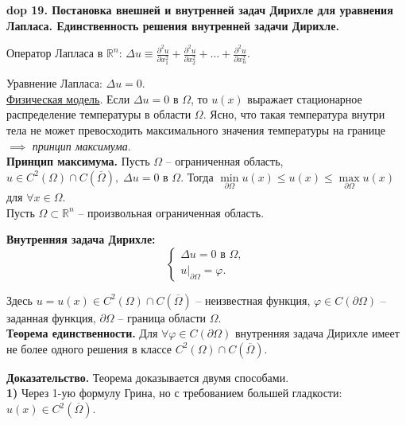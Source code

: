 \setcounter{section}{4}
\setcounter{subsection}{19}
\setcounter{equation}{0}
\textbf{\LARGE dop 19. Постановка внешней и внутренней задач Дирихле для уравнения Лапласа. Единственность решения внутренней задачи Дирихле.}

Оператор Лапласа в $\mathbb{R}^n$: $\Delta u \equiv \frac{\partial^2 u}{\partial x_1^2} + \frac{\partial^2 u}{\partial x_2^2} + \ldots + \frac{\partial^2 u}{\partial x_n^2}$.

Уравнение Лапласа: $\Delta u = 0$.\\

\underline{Физическая модель}. Если $\Delta u = 0$ в $\Omega$, то $u(x)$ выражает стационарное распределение
температуры в области $\Omega$. Ясно, что такая температура внутри тела не может превосходить максимального значения температуры на границе $\implies$ \textit{принцип максимума}.\\

\textbf{Принцип максимума.} Пусть $\Omega$ -- ограниченная область, $u \in C^2(\Omega) \cap C(\overline{\Omega}), \; \Delta u = 0$ в $\Omega$. Тогда $\min\limits_{\partial \Omega} u(x) \leq u(x) \leq \max\limits_{\partial \Omega} u(x)$ для $\forall x \in \Omega$. \\

Пусть $\Omega \subset \mathbb{R}^n$ -- произвольная ограниченная область.

\textbf{Внутренняя задача Дирихле:}
\begin{equation*}
    \begin{cases}
    \Delta u = 0 \text{ в } \Omega, \\
    u |_{\partial \Omega} = \varphi.
    \end{cases}
\end{equation*}

Здесь $u = u(x) \in C^2(\Omega) \cap C(\overline{\Omega})$ -- неизвестная функция, $\varphi \in C(\partial \Omega)$ -- заданная функция, $\partial \Omega$ -- граница области $\Omega$.
\\

\textbf{Теорема единственности.} Для 
$\forall \varphi \in C(\partial \Omega)$ внутренняя задача Дирихле имеет не более одного решения в классе $C^2(\Omega) \cap C(\overline{\Omega})$.

\textbf{Доказательство.} Теорема доказывается двумя способами.\\

\textbf{1)} Через 1-ую формулу Грина, но с требованием большей гладкости: $u(x) \in C^2(\overline{\Omega})$. 

